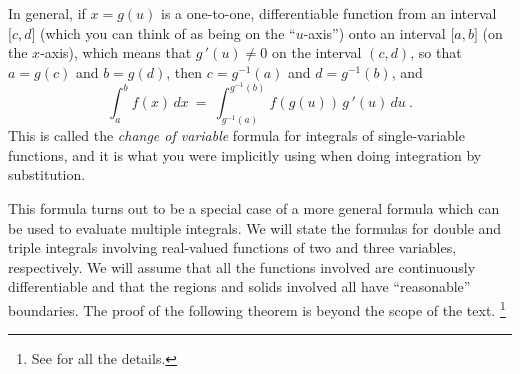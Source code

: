 In general, if $x = g(u)$ is a one-to-one, differentiable function from an interval $\lbrack c,d \rbrack$ (which you can
think of as being on the ``$u$-axis'') onto an interval $\lbrack a,b \rbrack$ (on the $x$-axis), which means that
$g\,'(u) \ne 0$ on the interval $(c,d)$, so that $a=g(c)$ and $b=g(d)$, then $c=g^{-1}(a)$ and $d=g^{-1}(b)$, and
\begin{equation}
 \int_a^b f(x)\,dx ~=~ \int_{g^{-1}(a)}^{g^{-1}(b)} f(g(u))\,g\,'(u)\,du ~.
\end{equation}
This is called the \emph{change of variable} formula for integrals of single-variable functions, and it is what you were
implicitly using when doing integration by substitution.

This formula turns out to be a special case of a more general
formula which can be used to evaluate multiple integrals. We will state the formulas for double and triple integrals
involving real-valued functions of two and three variables, respectively.
We will assume that all the functions involved are continuously differentiable and that the regions and solids involved
all have ``reasonable'' boundaries. 
The proof of the following theorem is beyond the scope of the text.%
\footnote{See \cite[\S\,15.32 and \S\,15.62]{tm} for all the details.}


